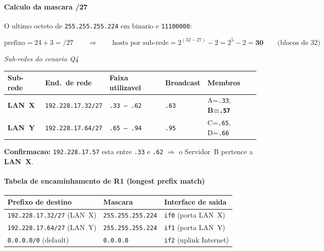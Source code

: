\documentclass[11pt,a4paper]{article}
\begin{document}
\begin{explicacao}

\paragraph{Calculo da mascara /27}

O ultimo octeto de \texttt{255.255.255.224} em binario e \texttt{11100000}:

\[
\text{prefixo} = 24 + 3 = /27 \qquad\Rightarrow\qquad
\text{hosts por sub-rede} = 2^{(32-27)} - 2 = 2^5 - 2 = \mathbf{30}
\qquad\text{(blocos de 32)}
\]

\begin{center}
{\small\textit{Sub-redes do cenario Q4}}\\[4pt]
\begin{tabular}{lllll}
\toprule
\textbf{Sub-rede} & \textbf{End.\ de rede} & \textbf{Faixa utilizavel} & \textbf{Broadcast} & \textbf{Membros} \\
\midrule
\textbf{LAN~X} & \texttt{192.228.17.32/27} & \texttt{.33 -- .62} & \texttt{.63} & A=\texttt{.33}, \textbf{B=\texttt{.57}} \\
\textbf{LAN~Y} & \texttt{192.228.17.64/27} & \texttt{.65 -- .94} & \texttt{.95} & C=\texttt{.65}, D=\texttt{.66} \\
\bottomrule
\end{tabular}
\end{center}

\textbf{Confirmacao:} \texttt{192.228.17.57} esta entre \texttt{.33} e \texttt{.62} $\Rightarrow$ o Servidor~B pertence a \textbf{LAN~X}.

\paragraph{Tabela de encaminhamento de R1 (longest prefix match)}

\begin{center}
\begin{tabular}{lll}
\toprule
\textbf{Prefixo de destino} & \textbf{Mascara} & \textbf{Interface de saida} \\
\midrule
\texttt{192.228.17.32/27} (LAN~X) & \texttt{255.255.255.224} & \texttt{if0} (porta LAN~X) \\
\texttt{192.228.17.64/27} (LAN~Y) & \texttt{255.255.255.224} & \texttt{if1} (porta LAN~Y) \\
\texttt{0.0.0.0/0} (default)       & \texttt{0.0.0.0}         & \texttt{if2} (uplink Internet) \\
\bottomrule
\end{tabular}
\end{center}


\end{explicacao}
\end{document}
